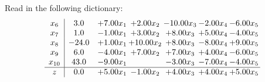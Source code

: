 \documentclass[9pt]{article}
\begin{document}
Read in the following dictionary:
\[\begin{array}{c| c c@{\hskip 2pt} c@{\hskip 2pt} c@{\hskip 2pt} c@{\hskip 2pt} c@{\hskip 2pt} }
 x_{6}   &  3.0 & +  7.00 x_{1} & +  2.00 x_{2} & -10.00 x_{3} & -2.00 x_{4} & -6.00 x_{5}\\
 x_{7}   &  1.0 & -1.00 x_{1} & +  3.00 x_{2} & +  8.00 x_{3} & +  5.00 x_{4} & -4.00 x_{5}\\
 x_{8}   &  -24.0 & +  1.00 x_{1} & + 10.00 x_{2} & +  8.00 x_{3} & -8.00 x_{4} & +  9.00 x_{5}\\
 x_{9}   &  6.0 & -4.00 x_{1} & +  7.00 x_{2} & +  7.00 x_{3} & +  4.00 x_{4} & -6.00 x_{5}\\
 x_{10}   &  43.0 & -9.00 x_{1} &   & -3.00 x_{3} & -7.00 x_{4} & -4.00 x_{5}\\
\hline
z    &  0.0 & +  5.00 x_{1} & -1.00 x_{2} & +  4.00 x_{3} & +  4.00 x_{4} & +  5.00 x_{5}\\
\end{array}\]
\end{document}
